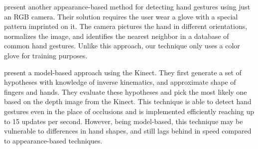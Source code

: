 \cite{wang2009} present another appearance-based method for detecting hand gestures using just an RGB camera. Their solution requires the user wear a glove with a special pattern imprinted on it. The camera pictures the hand in different orientations, normalizes the image, and identifies the nearest neighbor in a database of common hand gestures. Unlike this approach, our technique only uses a color glove for training purposes. 

\cite{oikonomidis2011} present a model-based approach using the Kinect. They first generate a set of hypotheses with knowledge of inverse kinematics, and approximate shape of fingers and hands. They evaluate these hypotheses and pick the most likely one based on the depth image from the Kinect. This technique is able to detect hand gestures even in the place of occlusions and is implemented efficiently reaching up to 15 updates per second. However, being model-based, this technique may be vulnerable to differences in hand shapes, and still lags behind in speed compared to appearance-based techniques. 
